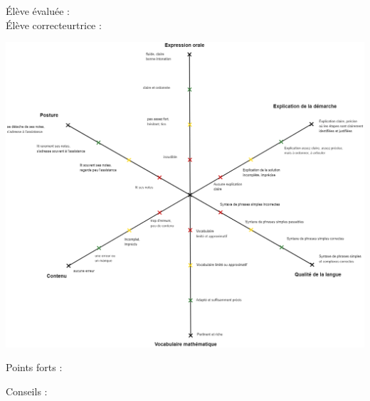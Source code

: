 \documentclass[12pt,a4paper,english,firamath]{nsi}
\begin{document}
\maketitle

Élève évalué\cdot e : \dotfill\\


Élève correcteur\cdot trice : \dotfill\\



\begin{center}
    \includegraphics[width=16cm]{img/grid.png}
\end{center}
\begin{multicols}{2}
    Points forts :\\[.5em]
    \columnbreak
    
    Conseils :\\[.5em]
\end{multicols}
\end{document}
